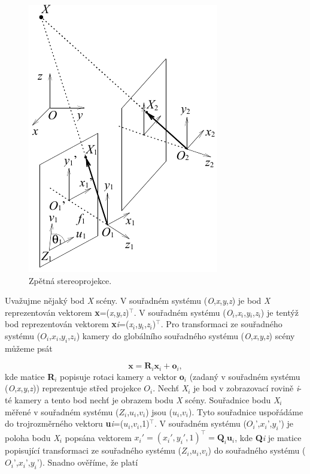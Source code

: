 \begin{figure}[th]
    \begin{center}
        \includegraphics[scale=.9]{11_stereo/images/img_11_1.pdf}
    \end{center}
    \caption{Zpětná stereoprojekce.}
    \label{img:11_1}
\end{figure}

Uvažujme nějaký bod \textit{X} scény. V souřadném systému (\textit{O},\textit{x},\textit{y},\textit{z}) je bod \textit{X} reprezentován vektorem \textbf{x}=(\textit{x},\textit{y},\textit{z})$^\top$. V souřadném systému (\textit{O}$_i$,\textit{x}$_i$,\textit{y}$_i$,\textit{z}$_i$) je tentýž bod reprezentován vektorem \textbf{x}\textit{i}=(\textit{x}$_i$,\textit{y}$_i$,\textit{z}$_i$)$^\top$. Pro transformaci ze souřadného systému ($O_i$,$x_i$,$y_i$,$z_i$)  kamery do globálního souřadného systému (\textit{O},\textit{x},\textit{y},\textit{z}) scény můžeme psát

\begin{equation} \label{eq:11_1}
    \mathbf{x}=\mathbf{R}_{i} \mathbf{x}_{i} + \mathbf{o}_{i},
\end{equation}
kde matice \textbf{R}$_i$ popisuje rotaci kamery a vektor \textbf{o}$_i$ (zadaný v souřadném systému (\textit{O},\textit{x},\textit{y},\textit{z})) reprezentuje střed projekce $O_i$. Nechť \textit{X}$_i$ je bod v zobrazovací rovině \textit{i}-té kamery a tento bod nechť je obrazem bodu \textit{X} scény. Souřadnice bodu \textit{X}$_i$ měřené v souřadném systému ($Z_i$,$u_i$,$v_i$) jsou ($u_i$,$v_i$). Tyto souřadnice uspořádáme do trojrozměrného vektoru \textbf{u}\textit{i}=($u_i$,$v_i$,1)$^\top$. V souřadném systému ($O_i$',$x_i$',$y_i$') je poloha bodu \textit{X}$_i$ popsána vektorem $x_i' = (x_i', y_i', 1)^\top = \mathbf{Q}_i \mathbf{u}_i$, kde \textbf{Q}\textit{i} je matice popisující transformaci ze souřadného systému ($Z_i$,$u_i$,$v_i$) do souřadného systému ($O_i$',$x_i$',$y_i$'). Snadno ověříme, že platí

